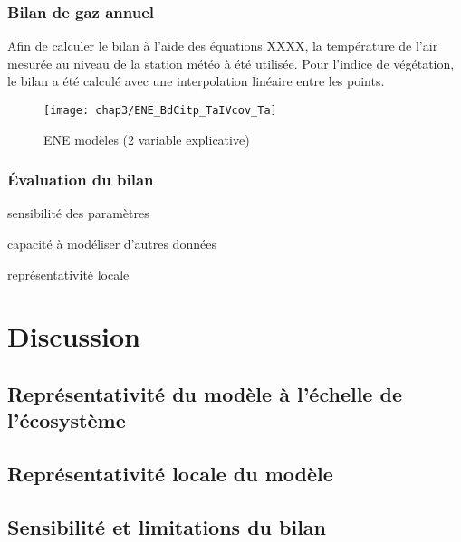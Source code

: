 \subsubsection{Bilan de gaz annuel}

Afin de calculer le bilan à l'aide des équations XXXX, la température de l'air mesurée au niveau de la station météo à été utilisée.
Pour l'indice de végétation, le bilan a été calculé avec une interpolation linéaire entre les points.

\begin{figure}
\centering
\texttt{[image: chap3/ENE\_BdCitp\_TaIVcov\_Ta]}
\caption{ENE modèles (2 variable explicative)}
\label{fig:ENE_BdC_Tair_mod_mes}
\end{figure}




\subsubsection{Évaluation du bilan}

sensibilité des paramètres

capacité à modéliser d'autres données

représentativité locale

\section{Discussion}

\subsection{Représentativité du modèle à l'échelle de l'écosystème}

\subsection{Représentativité locale du modèle}

\subsection{Sensibilité et limitations du bilan}


